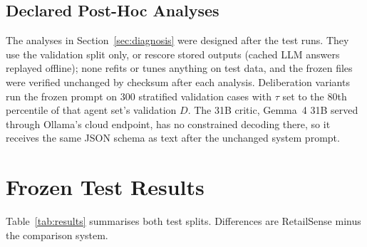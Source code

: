 \documentclass[conference]{IEEEtran}
\begin{document}
\subsection{Declared Post-Hoc Analyses}
The analyses in Section~\ref{sec:diagnosis} were designed after the test runs. They use the
validation split only, or rescore stored outputs (cached LLM answers replayed offline); none refits
or tunes anything on test data, and the frozen files were verified unchanged by checksum after each
analysis. Deliberation variants run the frozen prompt on 300 stratified validation cases with
$\tau$ set to the 80th percentile of that agent set's validation $D$. The 31B critic, Gemma~4 31B
served through Ollama's cloud endpoint, has no constrained decoding there, so it receives the same
JSON schema as text after the unchanged system prompt.

\section{Frozen Test Results}\label{sec:results}

Table~\ref{tab:results} summarises both test splits. Differences are RetailSense minus the
comparison system.
\end{document}
